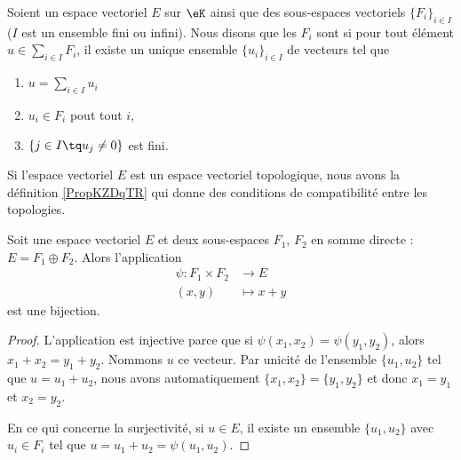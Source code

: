 \begin{definition}       \label{DEFooIJDNooRUDUYF}
    Soient un espace vectoriel \( E\) sur \(\eK\) ainsi que des sous-espaces vectoriels \( \{ F_i \}_{i\in I}\) (\( I\) est un ensemble fini ou infini). Nous disons que les \( F_i\) sont  si pour tout élément \( u\in\sum_{i\in I}F_i\), il existe un unique ensemble \( \{ u_i \}_{i\in I}\) de vecteurs tel que
	\begin{enumerate}
		\item
		      \( u=\sum_{i\in I}u_i\)
		\item
		      \( u_i\in F_i\) pout tout \( i\),
		\item
		      \( \{ j\in I\tq u_j\neq 0 \}\) est fini.
	\end{enumerate}

    Si l'espace vectoriel \( E\) est un espace vectoriel topologique, nous avons la définition \ref{PropKZDqTR} qui donne des conditions de compatibilité entre les topologies.
\end{definition}


\begin{lemma}   \label{LEMooHWRVooLedAmF}
    Soit une espace vectoriel \( E\) et deux sous-espaces \( F_1\), \( F_2\) en somme directe :  \( E=F_1\oplus F_2\). Alors l'application
    \begin{equation}
        \begin{aligned}
            \psi\colon F_1\times F_2&\to E \\
            (x,y)&\mapsto x+y 
        \end{aligned}
    \end{equation}
    est une bijection.
\end{lemma}

\begin{proof}
    L'application est injective parce que si \( \psi(x_1,x_2)=\psi(y_1,y_2)\), alors \( x_1+x_2=y_1+y_2\). Nommons \(u\) ce vecteur. Par unicité de l'ensemble \(  \{ u_1,u_2 \} \) tel que \( u=u_1+u_2\), nous avons automatiquement \( \{ x_1,x_2 \}=\{ y_1,y_2 \}\) et donc \( x_1=y_1\) et \( x_2=y_2\).

    En ce qui concerne la surjectivité, si \( u\in E\), il existe un ensemble \( \{ u_1,u_2 \}\) avec \( u_i\in F_i\) tel que \( u=u_1+u_2=\psi(u_1,u_2)\).
\end{proof}


